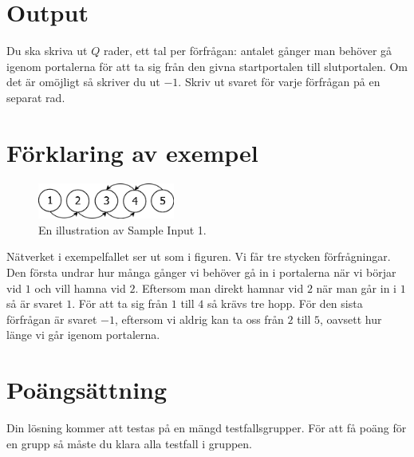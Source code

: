 \section*{Output}
Du ska skriva ut $Q$ rader, ett tal per förfrågan: antalet gånger man behöver gå
igenom portalerna för att ta sig från den givna startportalen till
slutportalen. Om det är omöjligt så skriver du ut $-1$. Skriv ut svaret
för varje förfrågan på en separat rad.

\section*{Förklaring av exempel}

\begin{figure}[ht!]
\centering
\includegraphics[width=0.4\textwidth]{portaler.png}
\caption{En illustration av Sample Input 1.}
\label{overflow}
\end{figure}

Nätverket i exempelfallet ser ut som i figuren. Vi får tre stycken förfrågningar. Den första
undrar hur många gånger vi behöver gå in i portalerna när vi börjar vid $1$ och vill hamna
vid $2$. Eftersom man direkt hamnar vid $2$ när man går in i $1$ så är svaret $1$. För att
ta sig från $1$ till $4$ så krävs tre hopp. För den sista förfrågan är svaret $-1$,
eftersom vi aldrig kan ta oss från $2$ till $5$, oavsett hur länge vi går igenom portalerna.

\section*{Poängsättning}
Din lösning kommer att testas på en mängd testfallsgrupper. För att få poäng för en grupp
så måste du klara alla testfall i gruppen.

